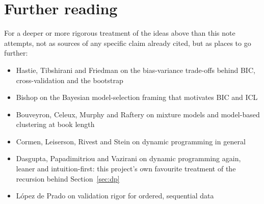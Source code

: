 \documentclass[11pt]{article}
\begin{document}
\section*{Further reading}

For a deeper or more rigorous treatment of the ideas above than this note
attempts, not as sources of any specific claim already cited, but as
places to go further:

\begin{itemize}[leftmargin=*]
\item Hastie, Tibshirani and Friedman on the bias-variance trade-offs
  behind BIC, cross-validation and the bootstrap \citeyearpar{hastie2009esl}
\item Bishop on the Bayesian model-selection framing that motivates BIC and
  ICL \citeyearpar{bishop2006prml}
\item Bouveyron, Celeux, Murphy and Raftery on mixture models and
  model-based clustering at book length \citeyearpar{bouveyron2021mbc}
\item Cormen, Leiserson, Rivest and Stein on dynamic programming in general
  \citeyearpar{cormen2022algorithms}
\item Dasgupta, Papadimitriou and Vazirani on dynamic programming again,
  leaner and intuition-first: this project's own favourite treatment of the
  recursion behind Section~\ref{sec:dp} \citeyearpar{dasgupta2006algorithms}
\item L\'opez de Prado on validation rigor for ordered, sequential data
  \citeyearpar{lopezdeprado2018financial}
\end{itemize}


\end{document}
